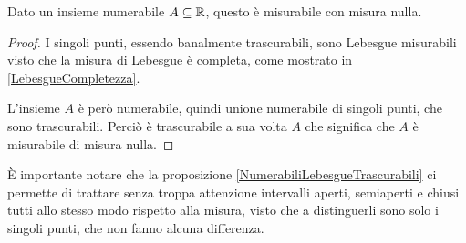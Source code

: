 \begin{proposition}\label{NumerabiliLebesgueTrascurabili}
	Dato un insieme numerabile $A\subseteq\mathbb R$, questo è misurabile con misura nulla.
\end{proposition}
\begin{proof}
	I singoli punti, essendo banalmente trascurabili, sono Lebesgue misurabili visto che la misura di Lebesgue è completa, come mostrato in \cref{LebesgueCompletezza}.
	
	L'insieme $A$ è però numerabile, quindi unione numerabile di singoli punti, che sono trascurabili. Perciò è trascurabile a sua volta $A$ che significa che $A$ è misurabile di misura nulla.
\end{proof}
\begin{remark}
	È importante notare che la proposizione \cref{NumerabiliLebesgueTrascurabili} ci permette di trattare senza troppa attenzione intervalli aperti, semiaperti e chiusi tutti allo stesso modo rispetto alla misura, visto che a distinguerli sono solo i singoli punti, che non fanno alcuna differenza.
\end{remark}




